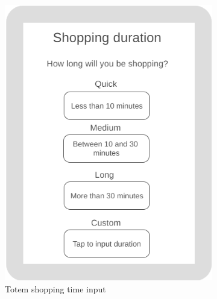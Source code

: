 \begin{figure}[h!]
\begin{subfigure}[b]{0.3\textwidth}
		\includegraphics[width=\linewidth]{../Diagrams/WireframesCLup/TotemTime.png}
		\caption{Totem shopping time input}
		\label{fig:WfTotemTime}
	\end{subfigure}
	\hfill
	\begin{subfigure}[b]{0.3\textwidth}

\end{subfigure}
\end{figure}
